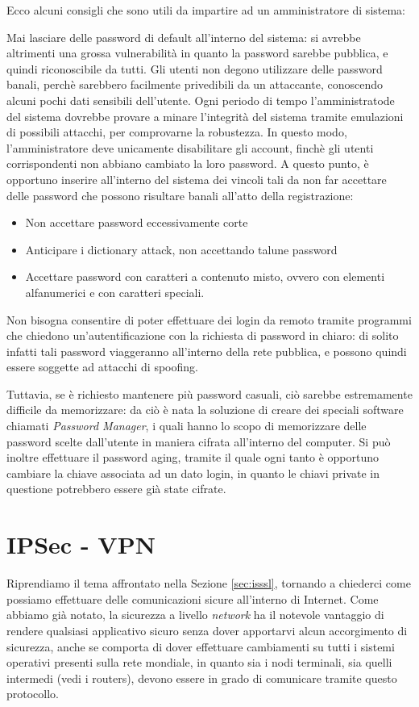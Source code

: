 Ecco alcuni consigli che sono utili da impartire ad un amministratore di sistema:
\begin{itemize}
\diam Mai lasciare delle password di default all'interno del sistema: si avrebbe
	altrimenti una grossa vulnerabilità in quanto la password sarebbe pubblica,
	e quindi riconoscibile da tutti.
\diam Gli utenti non degono utilizzare delle password banali, perchè sarebbero
	facilmente privedibili da un attaccante, conoscendo alcuni pochi dati
	sensibili dell'utente.
\diam Ogni periodo di tempo l'amministratode del sistema dovrebbe provare a 
	minare l'integrità del sistema tramite emulazioni di possibili attacchi,
	per comprovarne la robustezza. In questo modo, l'amministratore deve 
	unicamente disabilitare gli account, finchè gli utenti corrispondenti
	non abbiano cambiato la loro password. A questo punto, è opportuno
	inserire all'interno del sistema dei vincoli tali da non far accettare
	delle password che possono risultare banali all'atto della registrazione:
	\begin{itemize}
	\item Non accettare password eccessivamente corte
	\item Anticipare i dictionary attack, non accettando talune password
	\item Accettare password con caratteri a contenuto misto, ovvero con
		elementi alfanumerici e con caratteri speciali.
	\end{itemize}
\diam Non bisogna consentire di poter effettuare dei login da remoto tramite
	programmi che chiedono un'autentificazione con la richiesta di password
	in chiaro: di solito infatti tali password viaggeranno all'interno della
	rete pubblica, e possono quindi essere soggette ad attacchi di spoofing.
\end{itemize}

Tuttavia, se è richiesto mantenere più password casuali, ciò sarebbe estremamente
difficile da memorizzare: da ciò è nata la soluzione di creare dei speciali 
software chiamati \textit{Password Manager}, i quali hanno lo scopo di memorizzare
delle password scelte dall'utente in maniera cifrata all'interno del computer.
Si può inoltre effettuare il password aging, tramite il quale ogni tanto è 
opportuno cambiare la chiave associata ad un dato login, in quanto le chiavi
private in questione potrebbero essere già state cifrate.

\section{IPSec - VPN}
Riprendiamo il tema affrontato nella Sezione \vref{sec:isssl}, tornando a chiederci
come possiamo effettuare delle comunicazioni sicure all'interno di Internet. 
Come abbiamo già notato, la sicurezza a livello \textit{network} ha il notevole 
vantaggio di rendere qualsiasi applicativo sicuro senza dover apportarvi alcun
accorgimento di sicurezza, anche se comporta di dover effettuare cambiamenti su
tutti i sistemi operativi presenti sulla rete mondiale, in quanto sia i nodi
terminali, sia quelli intermedi (vedi i routers), devono essere in grado di comunicare tramite
questo protocollo.  

